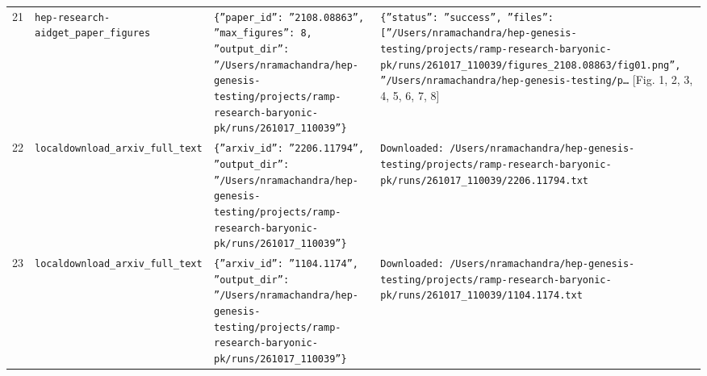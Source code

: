 \documentclass[11pt,a4paper]{article}
\begin{document}
\begin{longtable}{@{}p{}p{}p{}p{}@{}}
21 & \texttt{hep-research-aid}\newline\texttt{get\_\allowbreak{}paper\_\allowbreak{}figures} & \texttt{\{''paper\_\allowbreak{}id'':\allowbreak{} ''2108.08863'',\allowbreak{} ''max\_\allowbreak{}figures'':\allowbreak{} 8,\allowbreak{} ''output\_\allowbreak{}dir'':\allowbreak{} ''/\allowbreak{}Users/\allowbreak{}nramachandra/\allowbreak{}hep-genesis-testing/\allowbreak{}projects/\allowbreak{}ramp-research-baryonic-pk/\allowbreak{}runs/\allowbreak{}261017\_\allowbreak{}110039''\}\allowbreak{}} & \texttt{\{''status'':\allowbreak{} ''success'',\allowbreak{} ''files'':\allowbreak{} [''/\allowbreak{}Users/\allowbreak{}nramachandra/\allowbreak{}hep-genesis-testing/\allowbreak{}projects/\allowbreak{}ramp-research-baryonic-pk/\allowbreak{}runs/\allowbreak{}261017\_\allowbreak{}110039/\allowbreak{}figures\_\allowbreak{}2108.08863/\allowbreak{}fig01.png'',\allowbreak{} ''/\allowbreak{}Users/\allowbreak{}nramachandra/\allowbreak{}hep-genesis-testing/\allowbreak{}p\ldots{}\allowbreak{}} [Fig. 1, 2, 3, 4, 5, 6, 7, 8] \\
22 & \texttt{local}\newline\texttt{download\_\allowbreak{}arxiv\_\allowbreak{}full\_\allowbreak{}text} & \texttt{\{''arxiv\_\allowbreak{}id'':\allowbreak{} ''2206.11794'',\allowbreak{} ''output\_\allowbreak{}dir'':\allowbreak{} ''/\allowbreak{}Users/\allowbreak{}nramachandra/\allowbreak{}hep-genesis-testing/\allowbreak{}projects/\allowbreak{}ramp-research-baryonic-pk/\allowbreak{}runs/\allowbreak{}261017\_\allowbreak{}110039''\}\allowbreak{}} & \texttt{Downloaded:\allowbreak{} /\allowbreak{}Users/\allowbreak{}nramachandra/\allowbreak{}hep-genesis-testing/\allowbreak{}projects/\allowbreak{}ramp-research-baryonic-pk/\allowbreak{}runs/\allowbreak{}261017\_\allowbreak{}110039/\allowbreak{}2206.11794.txt} \\
23 & \texttt{local}\newline\texttt{download\_\allowbreak{}arxiv\_\allowbreak{}full\_\allowbreak{}text} & \texttt{\{''arxiv\_\allowbreak{}id'':\allowbreak{} ''1104.1174'',\allowbreak{} ''output\_\allowbreak{}dir'':\allowbreak{} ''/\allowbreak{}Users/\allowbreak{}nramachandra/\allowbreak{}hep-genesis-testing/\allowbreak{}projects/\allowbreak{}ramp-research-baryonic-pk/\allowbreak{}runs/\allowbreak{}261017\_\allowbreak{}110039''\}\allowbreak{}} & \texttt{Downloaded:\allowbreak{} /\allowbreak{}Users/\allowbreak{}nramachandra/\allowbreak{}hep-genesis-testing/\allowbreak{}projects/\allowbreak{}ramp-research-baryonic-pk/\allowbreak{}runs/\allowbreak{}261017\_\allowbreak{}110039/\allowbreak{}1104.1174.txt} \\

\end{longtable}
\end{document}
